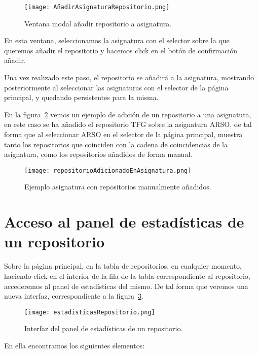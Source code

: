 \begin{figure}[h!]
  \texttt{[image: AñadirAsignaturaRepositorio.png]}
  \caption{Ventana modal añadir repositorio a asignatura.}
  \label{figure:repoAAsignatura}
\end{figure}

En esta ventana, seleccionamos la asignatura con el selector sobre la que
queremos añadir el repositorio y hacemos click en el botón de confirmación
añadir.

Una vez realizado este paso, el repositorio se añadirá a la asignatura,
mostrando posteriormente al seleccionar las asignaturas con el selector de
la página principal, y quedando persistentes para la misma.

En la figura~\ref{figure:asignaturaConReposManuales} vemos un ejemplo de
adición de un repositorio a una asignatura, en este caso se ha añadido el
repositorio TFG sobre la asignatura ARSO, de tal forma que al seleccionar
ARSO en el selector de la página principal, muestra tanto los repositorios
que coinciden con la cadena de coincidencias de la asignatura, como los
repositorios añadidos de forma manual.

\begin{figure}[h!]
  \texttt{[image: repositorioAdicionadoEnAsignatura.png]}
  \caption{Ejemplo asignatura con repositorios manualmente añadidos.}
  \label{figure:asignaturaConReposManuales}
\end{figure}

\section{Acceso al panel de estadísticas de un repositorio}

Sobre la página principal, en la tabla de repositorios, en cualquier
momento, haciendo click en el interior de la fila de la tabla
correspondiente al repositorio, accederemos al panel de estadísticas del
mismo. De tal forma que veremos una nueva interfaz, correspondiente a la
figura~\ref{figure:estadRepo}.

\begin{figure}[h!]
  \texttt{[image: estadisticasRepositorio.png]}
  \caption{Interfaz del panel de estadísticas de un repositorio.}
  \label{figure:estadRepo}
\end{figure}

En ella encontramos los siguientes elementos:

